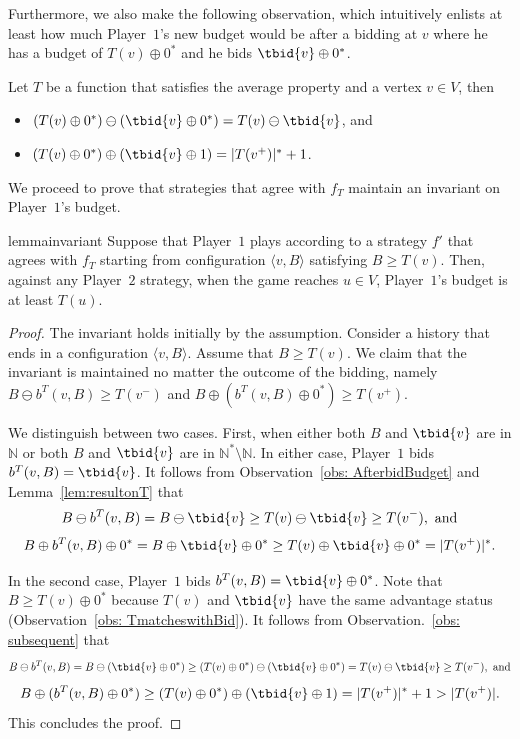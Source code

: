 \documentclass{article}\providecommand{\nequiv}{\not\equiv}\usepackage[a4paper,margin=20mm]{geometry}
\newcommand{\PO}{Player~$1$\xspace}
\newcommand{\PT}{Player~$2$\xspace}
\newcommand{\Nat}{\mathbb{N}}
\newcommand{\Natstro}{\mathbb{N}^* \setminus \mathbb{N}}
\newcommand{\zug}[1]{\langle #1  \rangle}
\newcommand{\succb}[1]{#1 \oplus 0^*\xspace}
\begin{document}
Furthermore, we also make the following observation, which intuitively enlists at least how much \PO's new budget would be after a bidding at \(v\) where he has a budget of \(\succb{T(v)}\) and he bids \(\succb{\tbid{v}}\).  


\begin{observation}\label{obs: subsequent}
	Let \(T\) be a function that satisfies the average property and a vertex \(v \in V\), then 
	\begin{itemize}
		\item $(\succb{T(v)}) \ominus (\succb{\tbid{v}}) = T(v) \ominus \tbid{v}$\label{itm: claimd}, and 
		\item $(\succb{T(v)}) \oplus (\tbid{v} \oplus 1) = |T(v^+)|^* + 1$. \label{itm: claime}
	\end{itemize}
\end{observation}


We proceed to prove that strategies that agree with $f_T$ maintain an invariant on \PO's budget. 

\begin{restatable}{lemma}{invariant}
	\label{lem: invariant}
	Suppose that \PO plays according to a strategy $f'$ that agrees with $f_T$ starting from configuration $\zug{v, B}$ satisfying $B \geq T(v)$. 
	Then, against any \PT strategy, when the game reaches \(u \in V\), \PO's budget is at least \(T(u)\).
\end{restatable}

\begin{proof}
The invariant holds initially by the assumption. 
Consider a history that ends in a configuration $\zug{v, B}$. Assume that \(B \geq T(v)\). We claim that the invariant is maintained no matter the outcome of the bidding, namely $B \ominus b^T(v,B) \geq T(v^-)$ and $B \oplus  (\succb{b^T(v,B)}) \geq T(v^+)$.


	We distinguish between two cases. 
	First, when either both \(B\) and \(\tbid{v}\) are in \(\Nat\) or both \(B\) and \(\tbid{v}\) are in  \(\Natstro\). 
	In either case, \PO bids \(b^T(v, B) = \tbid{v}\). 
	It follows from Observation~\ref{obs: AfterbidBudget} and Lemma~\ref{lem:resultonT} that
	\[B \ominus b^T(v, B) = B \ominus \tbid{v} \geq T(v) \ominus \tbid{v} \geq T(v^-), \text{ and}\] 
	\[B \oplus b^T(v, B) \oplus 0^* = B \oplus \tbid{v} \oplus 0^* \geq T(v) \oplus \tbid{v} \oplus 0^* = |T(v^+)|^*.\]
	
	
In the second case, \PO bids \(b^T(v, B) = \succb{\tbid{v}}\). 
	Note that  \(B \geq  \succb{T(v)}\) because \(T(v)\) and \(\tbid{v}\) have the same advantage status (Observation~\ref{obs: TmatcheswithBid}). 
It follows from Observation.~\ref{obs: subsequent} that
	\[B \ominus b^T(v, B) = B \ominus (\succb{\tbid{v}}) \geq (\succb{T(v)}) \ominus (\succb{\tbid{v}}) = T(v) \ominus \tbid{v} \geq T(v^-), \text{ and}\] 
	\[B \oplus (\succb{b^T(v, B)}) \geq (\succb{T(v)}) \oplus (\tbid{v} \oplus 1) = |T(v^+)|^* + 1 > |T(v^+)|.\] 
	This concludes the proof. 
\end{proof}
\end{document}
